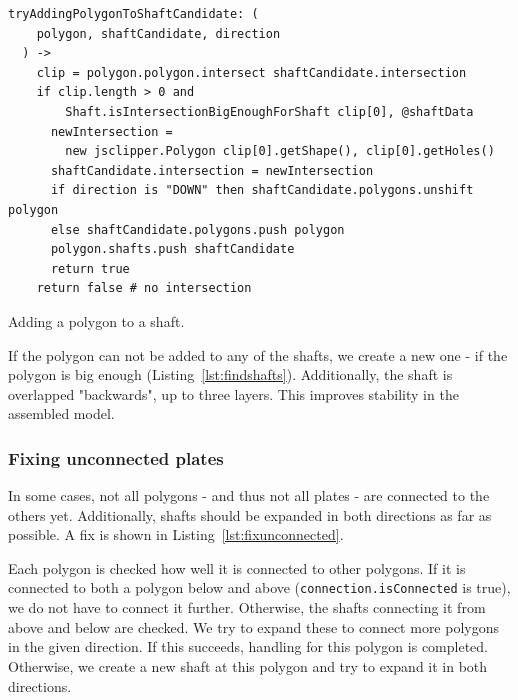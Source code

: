 \documentclass[../ClassicThesis.tex]{subfiles}
\begin{document}
\begin{listing}
\begin{verbatim}
tryAddingPolygonToShaftCandidate: (
    polygon, shaftCandidate, direction
  ) ->
    clip = polygon.polygon.intersect shaftCandidate.intersection
    if clip.length > 0 and
        Shaft.isIntersectionBigEnoughForShaft clip[0], @shaftData
      newIntersection =
        new jsclipper.Polygon clip[0].getShape(), clip[0].getHoles()
      shaftCandidate.intersection = newIntersection
      if direction is "DOWN" then shaftCandidate.polygons.unshift polygon
      else shaftCandidate.polygons.push polygon
      polygon.shafts.push shaftCandidate
      return true
    return false # no intersection
\end{verbatim}
\caption{Adding a polygon to a shaft.}
\label{lst:addpolytoshaft}
\end{listing}

If the polygon can not be added to any of the shafts, we create a new one - if the polygon is big enough (Listing~\ref{lst:findshafts}). Additionally, the shaft is overlapped "backwards", up to three layers. This improves stability in the assembled model.

\subsubsection{Fixing unconnected plates}

In some cases, not all polygons - and thus not all plates - are connected to the others yet. Additionally, shafts should be expanded in both directions as far as possible. A fix is shown in Listing~\ref{lst:fixunconnected}.

Each polygon is checked how well it is connected to other polygons. If it is connected to both a polygon below and above (\texttt{connection.isConnected} is true), we do not have to connect it further. Otherwise, the shafts connecting it from above and below are checked. We try to expand these to connect more polygons in the given direction. If this succeeds, handling for this polygon is completed. Otherwise, we create a new shaft at this polygon and try to expand it in both directions.
\end{document}

